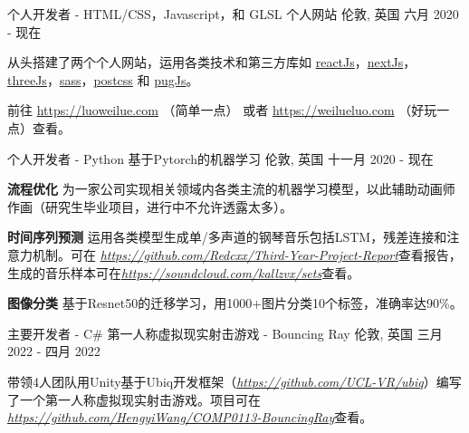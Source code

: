 

\begin{cventries}

  \cventry
    {个人开发者 - HTML/CSS，Javascript，和 GLSL} %
    {个人网站} %
    {伦敦, 英国} %
    {六月 2020 - 现在} %
    {
      \begin{cvitems} %
        \item {从头搭建了两个个人网站，运用各类技术和第三方库如 \href{https://reactjs.org/}{reactJs}，\href{https://nextjs.org/}{nextJs}，\href{https://threejs.org/}{threeJs}，\href{https://sass-lang.com/}{sass}，\href{https://postcss.org/}{postcss} 和 \href{https://pugjs.org/api/getting-started.html}{pugJs}。}
        \item 前往 \url{https://luoweilue.com} （简单一点） 或者 \url{https://weilueluo.com} （好玩一点）查看。
      \end{cvitems}
    }
    
  \cventry
    {个人开发者 - Python} %
    {基于Pytorch的机器学习} %
    {伦敦, 英国} %
    {十一月 2020 - 现在} %
    {
      \begin{cvitems} %
      \item {\textbf{流程优化} 为一家公司实现相关领域内各类主流的机器学习模型，以此辅助动画师作画（研究生毕业项目，进行中不允许透露太多）。}
      \item {\textbf{时间序列预测} 运用各类模型生成单/多声道的钢琴音乐包括LSTM，残差连接和注意力机制。可在 \href{https://github.com/Redcxx/Third-Year-Project-Report}{\textit{https://github.com/Redcxx/Third-Year-Project-Report}}查看报告，生成的音乐样本可在\href{https://soundcloud.com/kallzvx/sets}{\textit{https://soundcloud.com/kallzvx/sets}}查看。}
      \item {\textbf{图像分类} 基于Resnet50的迁移学习，用1000+图片分类10个标签，准确率达90\%。}
      \end{cvitems}
    }
    
  \cventry
    {主要开发者 - C\#} %
    {第一人称虚拟现实射击游戏 - Bouncing Ray} %
    {伦敦, 英国} %
    {三月 2022 - 四月 2022} %
    {
      \begin{cvitems} %
        \item {带领4人团队用Unity基于Ubiq开发框架（\href{https://github.com/UCL-VR/ubiq}{\textit{https://github.com/UCL-VR/ubiq}}）编写了一个第一人称虚拟现实射击游戏。项目可在 \href{https://github.com/HengyiWang/COMP0113-BouncingRay}{\textit{https://github.com/HengyiWang/COMP0113-BouncingRay}}查看。}
      \end{cvitems}
    }
  

\end{cventries}

